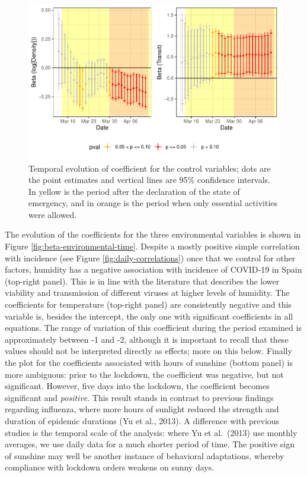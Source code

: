 \documentclass[]{elsarticle} %
\makeatletter
\def\maxwidth{\ifdim\Gin@nat@width>\linewidth\linewidth
\else\Gin@nat@width\fi}
\let\Oldincludegraphics\includegraphics
\renewcommand{\includegraphics}[1]{\Oldincludegraphics[width=\maxwidth]{#1}}
\makeatother
\begin{document}
\begin{figure}
\centering
\includegraphics{Environmental-Correlates-of-COVID19-Spain_files/figure-latex/beta-controls-time-1.pdf}
\caption{\label{fig:beta-controls-time}Temporal evolution of coefficient
for the control variables; dots are the point estimates and vertical
lines are 95\% confidence intervals. In yellow is the period after the
declaration of the state of emergency, and in orange is the period when
only essential activities were allowed.}
\end{figure}

The evolution of the coefficients for the three environmental variables
is shown in Figure \ref{fig:beta-environmental-time}. Despite a mostly
positive simple correlation with incidence (see Figure
\ref{fig:daily-correlations}) once that we control for other factors,
humidity has a negative association with incidence of COVID-19 in Spain
(top-right panel). This is in line with the literature that describes
the lower viability and transmission of different viruses at higher
levels of humidity. The coefficients for temperature (top-right panel)
are consistently negative and this variable is, besides the intercept,
the only one with significant coefficients in all equations. The range
of variation of this coefficient during the period examined is
approximately between -1 and -2, although it is important to recall that
these values should not be interpreted directly as effects; more on this
below. Finally the plot for the coefficients associated with hours of
sunshine (bottom panel) is more ambiguous: prior to the lockdown, the
coefficient was negative, but not significant. However, five days into
the lockdown, the coefficient becomes significant and \emph{positive}.
This result stands in contrast to previous findings regarding influenza,
where more hours of sunlight reduced the strength and duration of
epidemic durations (Yu et al., 2013). A difference with previous studies
is the temporal scale of the analysis: where Yu et al.~(2013) use
monthly averages, we use daily data for a much shorter period of time.
The positive sign of sunshine may well be another instance of behavioral
adaptations, whereby compliance with lockdown orders weakens on sunny
days.
\end{document}
